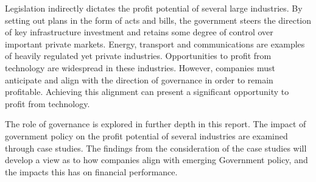 Legislation indirectly dictates the profit potential of several large industries.
By setting out plans in the form of acts and bills, the government steers the direction of key infrastructure investment and retains some degree of control over important private markets.
Energy, transport and communications are examples of heavily regulated yet private industries.
Opportunities to profit from technology are widespread in these industries. 
However, companies must anticipate and align with the direction of governance in order to remain profitable.
Achieving this alignment can present a significant opportunity to profit from technology.

The role of governance is explored in further depth in this report.
The impact of government policy on the profit potential of several industries are examined through case studies.
The findings from the consideration of the case studies will develop a view as to how companies align with emerging Government policy, and the impacts this has on financial performance.








